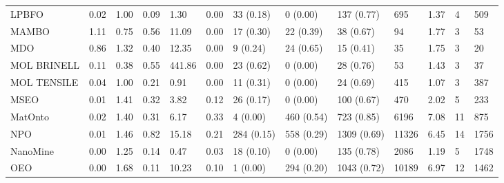 \begin{table}
\begin{tabular}{m{3.5cm}m{2cm}m{2cm}m{2cm}m{2cm}m{2cm}m{2cm}m{2cm}m{2cm}m{2cm}m{2cm}m{2cm}m{2cm}}
LPBFO                   &                0.02 &                  1.00 &                   0.09 &               1.30 &               0.00 &   33 (0.18) &    0 (0.00) &   137 (0.77) &             695 &     1.37 &          4 &               509 \\
MAMBO                   &                1.11 &                  0.75 &                   0.56 &              11.09 &               0.00 &   17 (0.30) &   22 (0.39) &    38 (0.67) &              94 &     1.77 &          3 &                53 \\
MDO                     &                0.86 &                  1.32 &                   0.40 &              12.35 &               0.00 &    9 (0.24) &   24 (0.65) &    15 (0.41) &              35 &     1.75 &          3 &                20 \\
MOL BRINELL             &                0.11 &                  0.38 &                   0.55 &             441.86 &               0.00 &   23 (0.62) &    0 (0.00) &    28 (0.76) &              53 &     1.43 &          3 &                37 \\
MOL TENSILE             &                0.04 &                  1.00 &                   0.21 &               0.91 &               0.00 &   11 (0.31) &    0 (0.00) &    24 (0.69) &             415 &     1.07 &          3 &               387 \\
MSEO                    &                0.01 &                  1.41 &                   0.32 &               3.82 &               0.12 &   26 (0.17) &    0 (0.00) &   100 (0.67) &             470 &     2.02 &          5 &               233 \\
MatOnto                 &                0.02 &                  1.40 &                   0.31 &               6.17 &               0.33 &    4 (0.00) &  460 (0.54) &   723 (0.85) &            6196 &     7.08 &         11 &               875 \\
NPO                     &                0.01 &                  1.46 &                   0.82 &              15.18 &               0.21 &  284 (0.15) &  558 (0.29) &  1309 (0.69) &           11326 &     6.45 &         14 &              1756 \\
NanoMine                &                0.00 &                  1.25 &                   0.14 &               0.47 &               0.03 &   18 (0.10) &    0 (0.00) &   135 (0.78) &            2086 &     1.19 &          5 &              1748 \\
OEO                     &                0.00 &                  1.68 &                   0.11 &              10.23 &               0.10 &    1 (0.00) &  294 (0.20) &  1043 (0.72) &           10189 &     6.97 &         12 &              1462 \\

\end{tabular}
\end{table}
